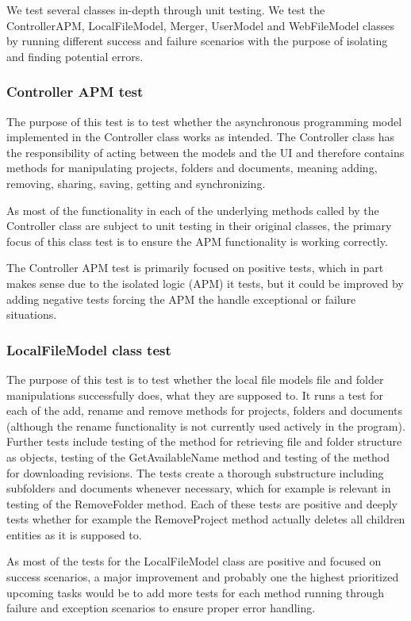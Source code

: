 We test several classes in-depth through unit testing. We test the ControllerAPM, LocalFileModel, Merger, UserModel and WebFileModel classes by running different success and failure scenarios with the purpose of isolating and finding potential errors.

\subsubsection{Controller APM test}
The purpose of this test is to test whether the asynchronous programming model implemented in the Controller class works as intended. The Controller class has the responsibility of acting between the models and the UI and therefore contains methods for manipulating projects, folders and documents, meaning adding, removing, sharing, saving, getting and synchronizing.

As most of the functionality in each of the underlying methods called by the Controller class are subject to unit testing in their original classes, the primary focus of this class test is to ensure the APM functionality is working correctly.

The Controller APM test is primarily focused on positive tests, which in part makes sense due to the isolated logic (APM) it tests, but it could be improved by adding negative tests forcing the APM the handle exceptional or failure situations.

\subsubsection{LocalFileModel class test}
The purpose of this test is to test whether the local file models file and folder manipulations successfully does, what they are supposed to. It runs a test for each of the add, rename and remove methods for projects, folders and documents (although the rename functionality is not currently used actively in the program). Further tests include testing of the method for retrieving file and folder structure as objects, testing of the GetAvailableName method and testing of the method for downloading revisions. The tests create a thorough substructure including subfolders and documents whenever necessary, which for example is relevant in testing of the RemoveFolder method. Each of these tests are positive and deeply tests whether for example the RemoveProject method actually deletes all children entities as it is supposed to.

As most of the tests for the LocalFileModel class are positive and focused on success scenarios, a major improvement and probably one the highest prioritized upcoming tasks would be to add more tests for each method running through failure and exception scenarios to ensure proper error handling.

